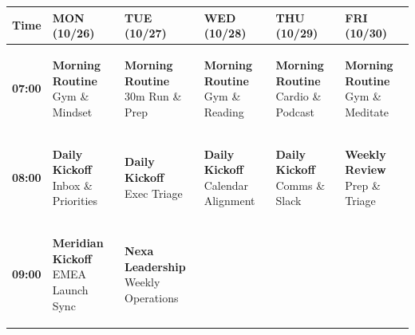 \documentclass[10pt, landscape]{article}
\begin{document}
\begin{minipage}[t]{0.72\linewidth}
  \setlength{\extrarowheight}{1.5pt}
  \begin{tabularx}{\linewidth}{|c|>{\raggedright\arraybackslash}X|>{\raggedright\arraybackslash}X|>{\raggedright\arraybackslash}X|>{\raggedright\arraybackslash}X|>{\raggedright\arraybackslash}X|}
    \hline
    \rowcolor{ExecNavy}
    \color{white}\textbf{Time} & \color{white}\textbf{MON (10/26)} & \color{white}\textbf{TUE (10/27)} & \color{white}\textbf{WED (10/28)} & \color{white}\textbf{THU (10/29)} & \color{white}\textbf{FRI (10/30)} \\
    \hline
    \textbf{07:00} &
    \colorbox{PersonalBg}{\parbox[t]{0.92\linewidth}{\tiny\color{PersonalTxt}\textbf{Morning Routine}\\Gym \& Mindset}} &
    \colorbox{PersonalBg}{\parbox[t]{0.92\linewidth}{\tiny\color{PersonalTxt}\textbf{Morning Routine}\\30m Run \& Prep}} &
    \colorbox{PersonalBg}{\parbox[t]{0.92\linewidth}{\tiny\color{PersonalTxt}\textbf{Morning Routine}\\Gym \& Reading}} &
    \colorbox{PersonalBg}{\parbox[t]{0.92\linewidth}{\tiny\color{PersonalTxt}\textbf{Morning Routine}\\Cardio \& Podcast}} &
    \colorbox{PersonalBg}{\parbox[t]{0.92\linewidth}{\tiny\color{PersonalTxt}\textbf{Morning Routine}\\Gym \& Meditate}} \\
    \hline
    \textbf{08:00} &
    \colorbox{AdminBg}{\parbox[t]{0.92\linewidth}{\tiny\color{AdminTxt}\textbf{Daily Kickoff}\\Inbox \& Priorities}} &
    \colorbox{AdminBg}{\parbox[t]{0.92\linewidth}{\tiny\color{AdminTxt}\textbf{Daily Kickoff}\\Exec Triage}} &
    \colorbox{AdminBg}{\parbox[t]{0.92\linewidth}{\tiny\color{AdminTxt}\textbf{Daily Kickoff}\\Calendar Alignment}} &
    \colorbox{AdminBg}{\parbox[t]{0.92\linewidth}{\tiny\color{AdminTxt}\textbf{Daily Kickoff}\\Comms \& Slack}} &
    \colorbox{AdminBg}{\parbox[t]{0.92\linewidth}{\tiny\color{AdminTxt}\textbf{Weekly Review}\\Prep \& Triage}} \\
    \hline
    \textbf{09:00} &
    \colorbox{MeetingBg}{\parbox[t]{0.92\linewidth}{\tiny\color{MeetingTxt}\textbf{Meridian Kickoff}\\EMEA Launch Sync}} &
    \colorbox{MeetingBg}{\parbox[t]{0.92\linewidth}{\tiny\color{MeetingTxt}\textbf{Nexa Leadership}\\Weekly Operations}} &

\end{tabularx}
\end{minipage}
\end{document}
